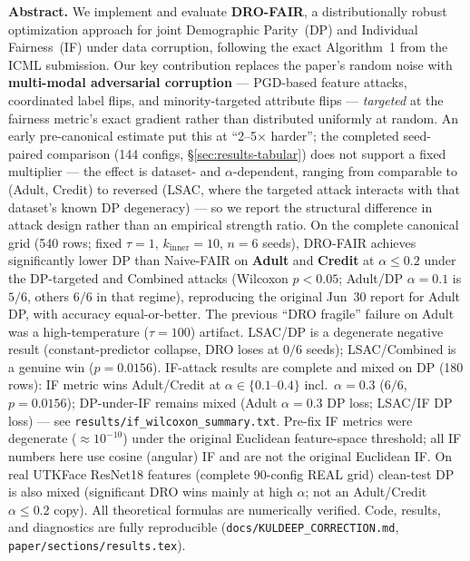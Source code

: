 \documentclass[11pt,a4paper]{article}
\begin{document}
\begin{mdframed}[backgroundcolor=noteblue,linecolor=hdrblue,linewidth=1pt,
                 innertopmargin=10pt,innerbottommargin=10pt]
\textbf{\color{hdrblue}Abstract.}\quad
We implement and evaluate \textbf{DRO-FAIR}, a distributionally robust
optimization approach for joint Demographic Parity~(DP) and Individual
Fairness~(IF) under data corruption, following the exact Algorithm~1 from
the ICML submission.  Our key contribution replaces the paper's random noise
with \textbf{multi-modal adversarial corruption} --- PGD-based feature attacks,
coordinated label flips, and minority-targeted attribute flips ---
\emph{targeted} at the fairness metric's exact gradient rather than
distributed uniformly at random.  An early pre-canonical estimate put
this at ``2--5$\times$ harder''; the completed seed-paired comparison
(144 configs, \S\ref{sec:results-tabular}) does not support a fixed
multiplier --- the effect is dataset- and $\alpha$-dependent, ranging
from comparable to (Adult, Credit) to reversed (LSAC, where the
targeted attack interacts with that dataset's known DP degeneracy) ---
so we report the structural difference in attack design rather than an
empirical strength ratio.
On the complete canonical grid (540 rows; fixed $\tau{=}1$,
$k_{\mathrm{inner}}{=}10$, $n{=}6$ seeds), DRO-FAIR achieves significantly
lower DP than Naive-FAIR on \textbf{Adult} and \textbf{Credit} at
$\alpha\le0.2$ under the DP-targeted and Combined attacks (Wilcoxon
$p{<}0.05$; Adult/DP $\alpha{=}0.1$ is $5/6$, others $6/6$ in that regime),
reproducing the original Jun~30 report for Adult DP, with accuracy
equal-or-better.  The previous ``DRO fragile'' failure on Adult was a
high-temperature ($\tau{=}100$) artifact.  LSAC/DP is a degenerate
negative result (constant-predictor collapse, DRO loses at $0/6$ seeds);
LSAC/Combined is a genuine win ($p{=}0.0156$).  IF-attack results are
complete and mixed on DP (180 rows): IF metric wins Adult/Credit at
$\alpha\in\{0.1$--$0.4\}$ incl.\ $\alpha{=}0.3$ ($6/6$, $p{=}0.0156$);
DP-under-IF remains mixed (Adult $\alpha{=}0.3$ DP loss; LSAC/IF DP loss)
--- see \texttt{results/if\_wilcoxon\_summary.txt}.  Pre-fix IF metrics were
degenerate ($\approx10^{-10}$) under the original Euclidean feature-space
threshold; all IF numbers here use cosine (angular) IF and are not the
original Euclidean IF.  On real UTKFace ResNet18 features
(complete 90-config REAL grid) clean-test DP is also mixed (significant DRO
wins mainly at high $\alpha$; not an Adult/Credit $\alpha\le0.2$ copy).
All theoretical formulas are numerically verified.
Code, results, and diagnostics are fully reproducible
(\texttt{docs/KULDEEP\_CORRECTION.md}, \texttt{paper/sections/results.tex}).
\end{mdframed}
\end{document}
